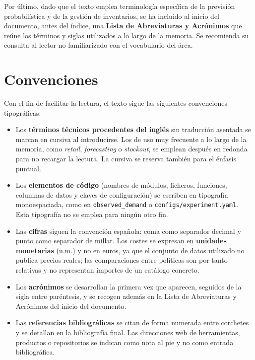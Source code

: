 Por último, dado que el texto emplea terminología específica de la previsión probabilística y de la
gestión de inventarios, se ha incluido al inicio del documento, antes del índice, una
\textbf{Lista de Abreviaturas y Acrónimos} que reúne los términos y siglas utilizados a lo largo de
la memoria. Se recomienda su consulta al lector no familiarizado con el vocabulario del área.

\section{Convenciones}
Con el fin de facilitar la lectura, el texto sigue las siguientes convenciones tipográficas:

\begin{itemize}
    \item Los \textbf{términos técnicos procedentes del inglés} sin traducción asentada se marcan en
    cursiva al introducirse. Los de uso muy frecuente a lo largo de la memoria, como \textit{retail},
    \textit{forecasting} o \textit{stockout}, se emplean después en redonda para no
    recargar la lectura. La cursiva se reserva también para el énfasis puntual.
    \item Los \textbf{elementos de código} (nombres de módulos, ficheros, funciones, columnas de
    datos y claves de configuración) se escriben en tipografía monoespaciada, como en
    \texttt{observed\_demand} o \texttt{configs/experiment.yaml}. Esta tipografía no se emplea para
    ningún otro fin.
    \item Las \textbf{cifras} siguen la convención española: coma como separador decimal y punto como
    separador de millar. Los costes se expresan en \textbf{unidades monetarias} (u.m.) y no en euros,
    ya que el conjunto de datos utilizado no publica precios reales; las comparaciones entre
    políticas son por tanto relativas y no representan importes de un catálogo concreto.
    \item Los \textbf{acrónimos} se desarrollan la primera vez que aparecen, seguidos de la sigla
    entre paréntesis, y se recogen además en la Lista de Abreviaturas y Acrónimos del inicio del
    documento.
    \item Las \textbf{referencias bibliográficas} se citan de forma numerada entre corchetes y se
    detallan en la bibliografía final. Las direcciones web de herramientas, productos o repositorios
    se indican como nota al pie y no como entrada bibliográfica.
\end{itemize}
